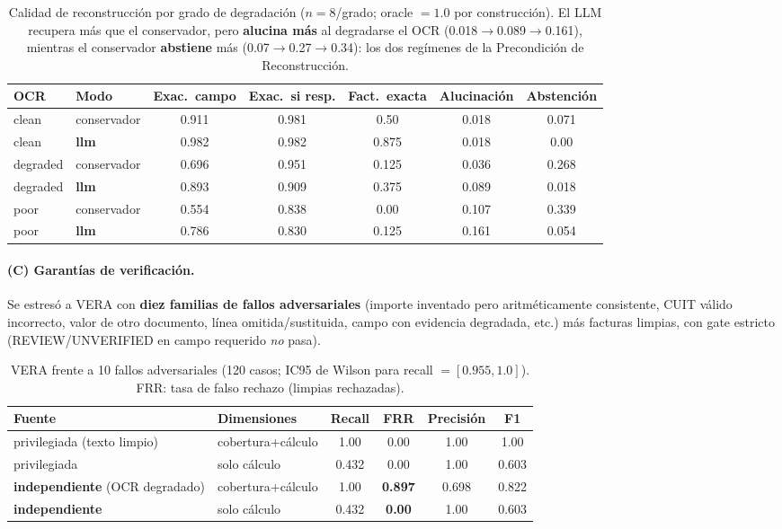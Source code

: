 \begin{table}[h]
\centering\small
\begin{tabular}{@{}l l ccccc@{}}
\toprule
\textbf{OCR} & \textbf{Modo} & \textbf{Exac.\ campo} & \textbf{Exac.\ si resp.} &
\textbf{Fact.\ exacta} & \textbf{Alucinación} & \textbf{Abstención} \\
\midrule
clean    & conservador & 0.911 & 0.981 & 0.50  & 0.018 & 0.071 \\
clean    & \textbf{llm} & 0.982 & 0.982 & 0.875 & 0.018 & 0.00 \\
degraded & conservador & 0.696 & 0.951 & 0.125 & 0.036 & 0.268 \\
degraded & \textbf{llm} & 0.893 & 0.909 & 0.375 & 0.089 & 0.018 \\
poor     & conservador & 0.554 & 0.838 & 0.00  & 0.107 & 0.339 \\
poor     & \textbf{llm} & 0.786 & 0.830 & 0.125 & 0.161 & 0.054 \\
\bottomrule
\end{tabular}
\caption{Calidad de reconstrucción por grado de degradación ($n=8$/grado; oracle $=1.0$ por
construcción). El LLM recupera más que el conservador, pero \textbf{alucina más} al degradarse
el OCR (0.018$\to$0.089$\to$0.161), mientras el conservador \textbf{abstiene} más
(0.07$\to$0.27$\to$0.34): los dos regímenes de la Precondición de Reconstrucción.}
\end{table}

\paragraph{(C) Garantías de verificación.} Se estresó a VERA con \textbf{diez familias de
fallos adversariales} (importe inventado pero aritméticamente consistente, CUIT válido
incorrecto, valor de otro documento, línea omitida/sustituida, campo con evidencia degradada,
etc.) más facturas limpias, con gate estricto (REVIEW/UNVERIFIED en campo requerido
\emph{no} pasa).

\begin{table}[h]
\centering\small
\begin{tabular}{@{}l l cccc@{}}
\toprule
\textbf{Fuente} & \textbf{Dimensiones} & \textbf{Recall} & \textbf{FRR} & \textbf{Precisión} & \textbf{F1} \\
\midrule
privilegiada (texto limpio) & cobertura+cálculo & 1.00 & 0.00 & 1.00 & 1.00 \\
privilegiada & solo cálculo & 0.432 & 0.00 & 1.00 & 0.603 \\
\textbf{independiente} (OCR degradado) & cobertura+cálculo & 1.00 & \textbf{0.897} & 0.698 & 0.822 \\
\textbf{independiente} & solo cálculo & 0.432 & \textbf{0.00} & 1.00 & 0.603 \\
\bottomrule
\end{tabular}
\caption{VERA frente a 10 fallos adversariales (120 casos; IC95 de Wilson para recall
$=[0.955,1.0]$). FRR: tasa de falso rechazo (limpias rechazadas).}
\end{table}

